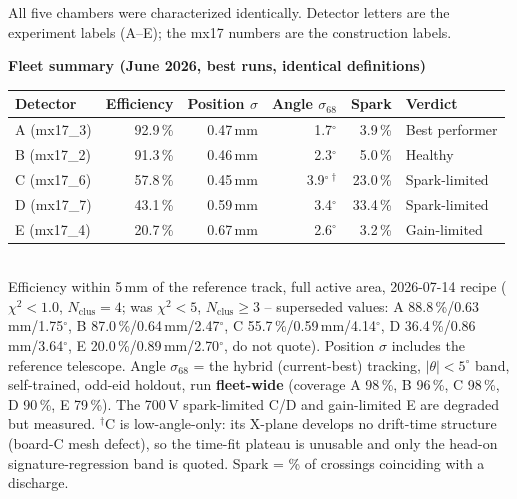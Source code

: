 \documentclass[11pt]{article}
\newenvironment{keybox}[1]{%
  \begin{lrbox}{\keyboxsave}\begin{minipage}{0.88\textwidth}%
  {\small\bfseries\textcolor{keyframe}{#1}}\par\smallskip
}{%
  \end{minipage}\end{lrbox}%
  \begin{center}\setlength{\fboxsep}{8pt}%
  \fcolorbox{keyframe}{keybg}{\usebox{\keyboxsave}}\end{center}}
\begin{document}
All five chambers were characterized identically. Detector letters are the
experiment labels (A--E); the mx17 numbers are the construction labels.

\begin{keybox}{Fleet summary (June 2026, best runs, identical definitions)}
\begin{tabular}{@{}lrrrrl@{}}
\toprule
Detector & Efficiency & Position $\sigma$ & Angle $\sigma_{68}$ & Spark & Verdict \\
\midrule
A (mx17\_3) & 92.9\,\% & 0.47\,mm & 1.7$^\circ$ & 3.9\,\% & Best performer \\
B (mx17\_2) & 91.3\,\% & 0.46\,mm & 2.3$^\circ$ & 5.0\,\% & Healthy \\
C (mx17\_6) & 57.8\,\% & 0.45\,mm & 3.9$^\circ$\,$^\dagger$ & 23.0\,\% & Spark-limited \\
D (mx17\_7) & 43.1\,\% & 0.59\,mm & 3.4$^\circ$ & 33.4\,\% & Spark-limited \\
E (mx17\_4) & 20.7\,\% & 0.67\,mm & 2.6$^\circ$ & 3.2\,\% & Gain-limited \\
\bottomrule
\end{tabular}\\[4pt]
{\footnotesize Efficiency within 5\,mm of the reference track, full active
area, 2026-07-14 recipe ($\chi^2<1.0$, $N_\mathrm{clus}=4$; was $\chi^2<5$,
$N_\mathrm{clus}\ge3$ -- superseded values: A 88.8\,\%/0.63\,mm/1.75$^\circ$,
B 87.0\,\%/0.64\,mm/2.47$^\circ$, C 55.7\,\%/0.59\,mm/4.14$^\circ$,
D 36.4\,\%/0.86\,mm/3.64$^\circ$, E 20.0\,\%/0.89\,mm/2.70$^\circ$, do not
quote). Position $\sigma$ includes the reference telescope. Angle $\sigma_{68}$
= the hybrid (current-best) tracking, $|\theta|<5^\circ$ band, self-trained,
odd-eid holdout, run \textbf{fleet-wide} (coverage A 98\,\%, B 96\,\%, C 98\,\%,
D 90\,\%, E 79\,\%). The 700\,V spark-limited C/D and gain-limited E are
degraded but measured. $^\dagger$C is low-angle-only: its X-plane develops no
drift-time structure (board-C mesh defect), so the time-fit plateau is unusable
and only the head-on signature-regression band is quoted. Spark = \% of
crossings coinciding with a discharge.}
\end{keybox}
\end{document}
